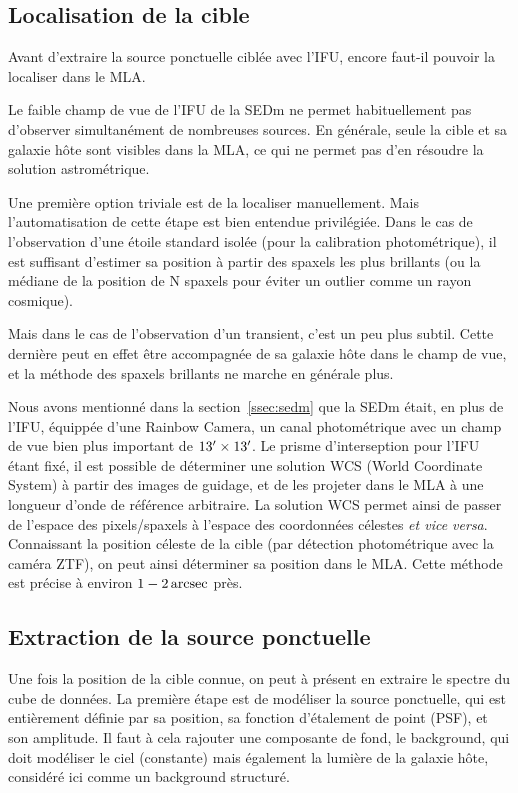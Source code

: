 \documentclass[../main/main.tex]{subfiles}
\begin{document}
\subsection{Localisation de la cible}\label{ssec:targetlocpysedm}

Avant d'extraire la source ponctuelle ciblée avec l'IFU, encore faut-il
pouvoir la localiser dans le MLA.

Le faible champ de vue de l'IFU de la SEDm ne permet habituellement pas
d'observer simultanément de nombreuses sources. En générale, seule la
cible et sa galaxie hôte sont visibles dans la MLA, ce qui ne permet pas
d'en résoudre la solution astrométrique.

Une première option triviale est de la
localiser manuellement. Mais l'automatisation de cette étape est bien
entendue privilégiée. Dans le cas de l'observation d'une étoile standard isolée
(pour la calibration photométrique), il est suffisant d'estimer sa
position à partir des spaxels les plus brillants (ou la médiane de la
position de N spaxels pour éviter un outlier comme un rayon cosmique).

Mais dans le cas de l'observation d'un transient, c'est un peu plus
subtil. Cette dernière peut en effet être accompagnée de sa galaxie hôte
dans le champ de vue, et la méthode des spaxels brillants ne marche en
générale plus.

Nous avons mentionné dans la section~\ref{ssec:sedm} que la SEDm était,
en plus de l'IFU, équippée d'une Rainbow Camera, un canal
photométrique avec un champ de vue bien plus important de
$13^\prime\times13^\prime$. Le prisme d'interseption pour l'IFU étant
fixé, il est possible de déterminer une solution WCS (World Coordinate
System) à partir des images de guidage, et de les projeter dans le MLA à
une longueur d'onde de référence arbitraire. La solution WCS permet
ainsi de passer de l'espace des pixels/spaxels à l'espace des
coordonnées célestes \textit{et vice versa}. Connaissant la position
céleste de la cible (par détection photométrique avec la
caméra ZTF), on peut ainsi déterminer sa position dans le MLA. Cette
méthode est précise à environ $1-2\arcsec$ près.

\subsection{Extraction de la source ponctuelle}\label{ssec:sourceextractpysedm}

Une fois la position de la cible connue, on peut à présent en extraire
le spectre du cube de données. La première étape est de modéliser la
source ponctuelle, qui est entièrement définie par sa position, sa fonction
d'étalement de point (PSF), et son amplitude. Il faut à cela
rajouter une composante de fond, le background, qui doit modéliser le
ciel (constante) mais également la lumière de la galaxie hôte, considéré ici
comme un background structuré.
\end{document}
